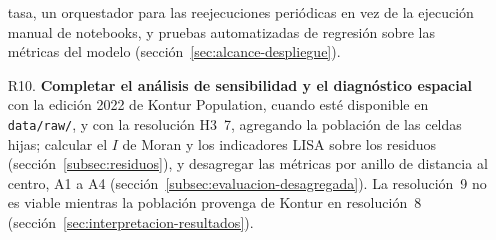 \begin{enumerate}
        tasa, un orquestador para las reejecuciones periódicas en vez de la ejecución manual
        de notebooks, y pruebas automatizadas de regresión sobre las métricas del modelo
        (sección~\ref{sec:alcance-despliegue}).
  \item [R10.] \textbf{Completar el análisis de sensibilidad y el diagnóstico espacial} con la
        edición 2022 de Kontur Population, cuando esté disponible en \texttt{data/raw/}, y con
        la resolución H3~7, agregando la población de las celdas hijas; calcular el $I$ de
        Moran y los indicadores LISA sobre los residuos (sección~\ref{subsec:residuos}), y
        desagregar las métricas por anillo de distancia al centro, A1 a A4
        (sección~\ref{subsec:evaluacion-desagregada}). La resolución~9 no es viable mientras
        la población provenga de Kontur en resolución~8
        (sección~\ref{sec:interpretacion-resultados}).
\end{enumerate}
